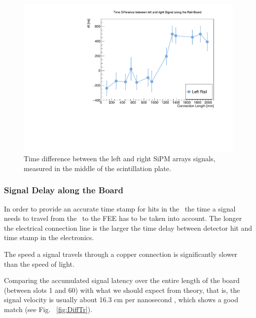 \documentclass[../BTOF_summary.tex]{subfiles}
\begin{document}
\begin{figure}[h!]
    \centering
    \includegraphics[scale=0.5]{Pictures/TimeDiff_leftRight.pdf}
    \caption{Time difference between the left and right SiPM arrays signals, measured in the middle of the scintillation plate.}
    \label{fig:Diff}
\end{figure}

\subsubsection{Signal Delay along the Board}

In order to provide an accurate time stamp for hits in the \btofD\ the time a signal needs to travel from the \sipms\ to the FEE has to be taken into account. The longer the electrical connection line is the larger the time delay between detector hit and time stamp in the electronics.

The speed a signal travels through a copper connection is significantly slower than the speed of light.

Comparing the accumulated signal latency over the entire length of the board (between slots 1 and 60) with what we should expect from theory, that is, the signal velocity is usually about 16.3 cm per nanosecond \cite{bril,paul}, which shows a good match (see Fig. ~\ref{fig:DiffTr}).
\end{document}
